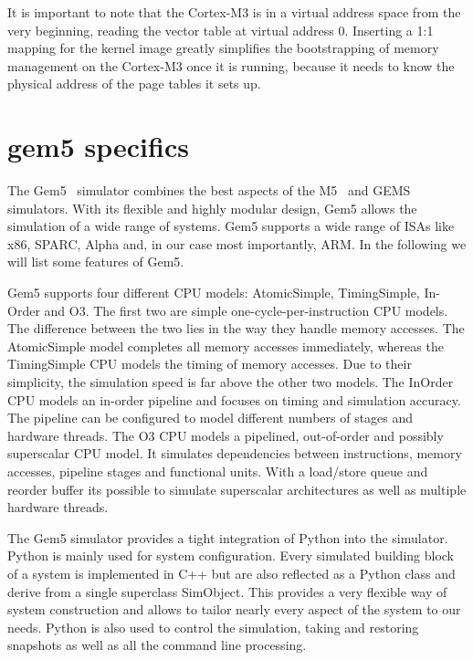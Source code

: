 \documentclass[a4paper,twoside]{report} %
\begin{document}
It is important to note that the Cortex-M3 is in a virtual address
space from the very beginning, reading the vector table at virtual
address 0. Inserting a 1:1 mapping for the kernel image greatly
simplifies the bootstrapping of memory management on the Cortex-M3
once it is running, because it needs to know the physical address of
the page tables it sets up.

\section{gem5 specifics}

The Gem5~\cite{gem5:sigarch11} simulator combines the best aspects of
the M5~\cite{m5:micro06} and GEMS~\cite{gems:sigarch05}
simulators. With its flexible and highly modular design, Gem5 allows
the simulation of a wide range of systems. Gem5 supports a wide range
of ISAs like x86, SPARC, Alpha and, in our case most importantly,
ARM. In the following we will list some features of Gem5.

Gem5 supports four different CPU models: AtomicSimple, TimingSimple,
In-Order and O3. The first two are simple one-cycle-per-instruction
CPU models. The difference between the two lies in the way they handle
memory accesses. The AtomicSimple model completes all memory accesses
immediately, whereas the TimingSimple CPU models the timing of memory
accesses. Due to their simplicity, the simulation speed is far above
the other two models.  The InOrder CPU models an in-order pipeline and
focuses on timing and simulation accuracy. The pipeline can be
configured to model different numbers of stages and hardware threads.
The O3 CPU models a pipelined, out-of-order and possibly superscalar
CPU model. It simulates dependencies between instructions, memory
accesses, pipeline stages and functional units. With a load/store
queue and reorder buffer its possible to simulate superscalar
architectures as well as multiple hardware threads.

The Gem5 simulator provides a tight integration of Python into the
simulator. Python is mainly used for system configuration. Every
simulated building block of a system is implemented in C++ but are
also reflected as a Python class and derive from a single superclass
SimObject. This provides a very flexible way of system construction
and allows to tailor nearly every aspect of the system to our needs.
Python is also used to control the simulation, taking and restoring
snapshots as well as all the command line processing.
\end{document}
